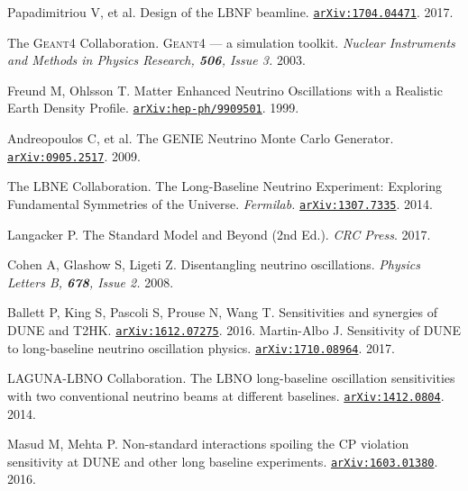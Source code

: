 \begin{thebibliography}{100}
	 Papadimitriou V, et al. Design of the LBNF beamline.
		\href{https://arxiv.org/abs/1704.04471}{\texttt{arXiv:1704.04471}}. 2017.

	 The \textsc{Geant4} Collaboration.
		\textsc{Geant4} --- a simulation toolkit. \textit{Nuclear Instruments and Methods in
		Physics Research, \textbf{506}, Issue 3.} 2003. 

	 Freund M, Ohlsson T. Matter Enhanced Neutrino Oscillations
		with a Realistic Earth Density Profile.
		\href{https://arxiv.org/abs/hep-ph/9909501}{\texttt{arXiv:hep-ph/9909501}}.
		1999.

	 Andreopoulos C, et al. The \textsc{GENIE} Neutrino Monte
		Carlo Generator.
		\href{https://arxiv.org/abs/0905.2517}{\texttt{arXiv:0905.2517}}. 2009.

	 The LBNE Collaboration. The Long-Baseline Neutrino Experiment:
		Exploring Fundamental Symmetries of the Universe.
		\textit{Fermilab.}
		\href{https://arxiv.org/abs/1307.7335}{\texttt{arXiv:1307.7335}}. 2014.

	 Langacker P. The Standard Model and Beyond (2nd Ed.).
		\textit{CRC Press}. 2017.

	 Cohen A, Glashow S, Ligeti Z. Disentangling neutrino
		oscillations. \textit{Physics Letters B, \textbf{678}, Issue 2.} 2008.

	 Ballett P, King S, Pascoli S, Prouse N, Wang T.
		Sensitivities and synergies of DUNE and T2HK. \href{
		https://arxiv.org/pdf/1612.07275.pdf}{\texttt{arXiv:1612.07275}}. 2016.
	 Martin-Albo J. Sensitivity of DUNE to long-baseline
		neutrino oscillation physics.
		\href{https://arxiv.org/abs/1710.08964}{\texttt{arXiv:1710.08964}}. 2017.

	 LAGUNA-LBNO Collaboration. The LBNO long-baseline
		oscillation sensitivities with two conventional neutrino beams at different
		baselines.
		\href{https://arxiv.org/abs/1412.0804}{\texttt{arXiv:1412.0804}}. 2014.

	 Masud M, Mehta P. Non-standard interactions spoiling the CP
		violation sensitivity at DUNE and other long baseline experiments.
		\href{https://arxiv.org/abs/1603.01380}{\texttt{arXiv:1603.01380}}. 2016.

\end{thebibliography}
